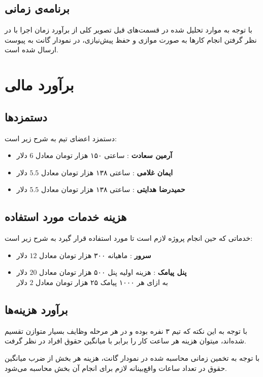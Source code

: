 \renewcommand{\arraystretch}{1.7}

\subsection{برنامه‌ی زمانی}
با توجه به موارد تحلیل شده در قسمت‌های قبل تصویر کلی از برآورد زمان اجرا با در نظر گرفتن انجام کار‌ها به صورت موازی و حفظ پیش‌نیازی، در نمودار گانت
به پیوست ارسال شده است.

\section{برآورد مالی}
\subsection{دستمزدها}
دستمزد اعضای تیم به شرح زیر است:
\begin{itemize}
	\item 
	\textbf{آرمین سعادت}
	: ساعتی ۱۵۰ هزار تومان معادل
 	$6$
	 دلار
	\item 
	\textbf{ایمان غلامی}
	: ساعتی ۱۳۸ هزار تومان معادل 
	$5.5$
	دلار
	\item 
	\textbf{حمیدرضا هدایتی}
	: ساعتی ۱۳۸ هزار تومان معادل 
	$5.5$
	دلار
\end{itemize}

\subsection{هزینه خدمات مورد استفاده}
خدماتی که حین انجام پروژه لازم است تا مورد استفاده قرار گیرد به شرح زیر است:
\begin{itemize}
	\item 
	\textbf{سرور}
	: ماهیانه ۳۰۰ هزار تومان معادل 	$12$ دلار
	\item 
	\textbf{پنل پیامک}
	:
	هزینه اولیه پنل ۵۰۰ هزار تومان معادل 	$20$ دلار
	\\
	به ازای هر ۱۰۰۰ پیامک ۲۵ هزار تومان معادل 
	$2$
	دلار

\end{itemize}

\subsection{برآورد هزینه‌ها}
با توجه به این نکته که تیم ۳ نفره بوده و در هر مرحله وظایف بسیار متوازن تقسیم شده‌اند، میتوان هزینه هر ساعت کار را برابر با میانگین حقوق افراد در نظر گرفت.

با توجه به تخمین زمانی محاسبه شده در نمودار گانت، هزینه هر بخش از ضرب میانگین حقوق در تعداد ساعات واقع‌بینانه لازم برای انجام آن بخش محاسبه می‌شود.

